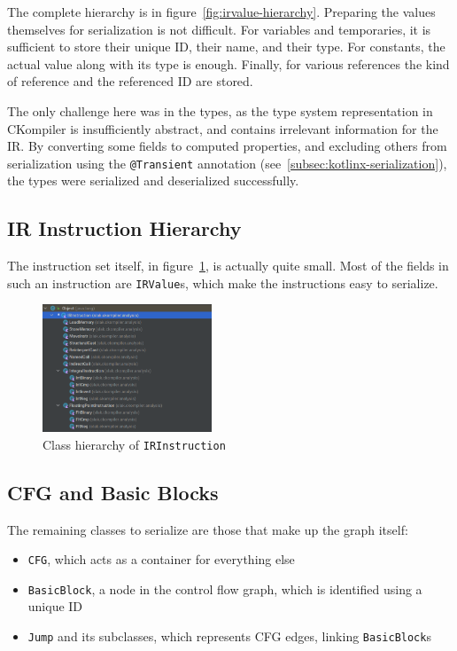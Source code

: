 \documentclass[lettersize,journal]{IEEEtran}
\begin{document}
    The complete hierarchy is in figure~\ref{fig:irvalue-hierarchy}.
    Preparing the values themselves for serialization is not difficult.
    For variables and temporaries, it is sufficient to store their unique ID, their name, and their type.
    For constants, the actual value along with its type is enough.
    Finally, for various references the kind of reference and the referenced ID are stored.

    The only challenge here was in the types, as the type system representation in CKompiler is insufficiently
    abstract, and contains irrelevant information for the IR\@.
    By converting some fields to computed properties, and excluding others from serialization using the
    \texttt{@Transient} annotation (see~\ref{subsec:kotlinx-serialization}), the types were serialized and deserialized
    successfully.

    \subsection{IR Instruction Hierarchy}\label{subsec:ir-instruction-hierarchy}

    The instruction set itself, in figure~\ref{fig:irinstruction-hierarchy}, is actually quite small.
    Most of the fields in such an instruction are \texttt{IRValue}s, which make the instructions easy to serialize.

    \begin{figure}[th]
        \centering
        \includegraphics[width=0.45\textwidth]{pics/irinstruction-hierarchy}
        \caption{Class hierarchy of \texttt{IRInstruction}}
        \label{fig:irinstruction-hierarchy}
    \end{figure}

    \subsection{CFG and Basic Blocks}\label{subsec:cfg-and-basic-blocks}

    The remaining classes to serialize are those that make up the graph itself:
    \begin{itemize}
        \item \texttt{CFG}, which acts as a container for everything else
        \item \texttt{BasicBlock}, a node in the control flow graph, which is identified using a unique ID
        \item \texttt{Jump} and its subclasses, which represents CFG edges, linking \texttt{BasicBlock}s
    \end{itemize}
\end{document}
